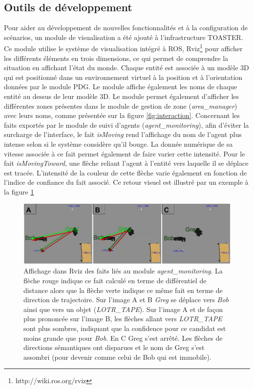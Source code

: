 \documentclass[a4paper,11pt,twoside]{StyleThese}
\begin{document}
\subsection{Outils de développement}
Pour aider au développement de nouvelles fonctionnalités et à la configuration de scénarios, un module de visualisation a été ajouté à l'infrastructure TOASTER. Ce module utilise le système de visualisation intégré à ROS, Rviz\footnote{http://wiki.ros.org/rviz} pour afficher les différents éléments en trois dimensions, ce qui permet de comprendre la situation en affichant l'état du monde. Chaque entité est associée à un modèle 3D qui est positionné dans un environnement virtuel à la position et à l'orientation données par le module PDG. Le module affiche également les noms de chaque entité au dessus de leur modèle 3D. 
Le module permet également d'afficher les différentes zones présentes dans le module de gestion de zone (\textit{area\_manager}) avec leurs noms, comme présentée sur la figure \ref{fig:interaction}.
Concernant les faits exportés par le module de suivi d'agents (\textit{agent\_monitoring}), afin d'éviter la surcharge de l'interface, le fait \textit{isMoving} rend l'affichage du nom de l'agent plus intense selon si le système considère qu'il bouge. La donnée numérique de sa vitesse associée à ce fait permet également de faire varier cette intensité. Pour le fait \textit{isMovingToward}, une flèche reliant l'agent à l'entité vers laquelle il se déplace est tracée. L'intensité de la couleur de cette flèche varie également en fonction de l'indice de confiance du fait associé. Ce retour visuel est illustré par un exemple à la figure \ref{fig:moving}

\begin{figure}[ht!]
 \centering
  \includegraphics[width=1.0\linewidth]{./img/movingToward.jpg} 
  \caption {Affichage dans Rviz des faits liés au module \textit{agent\_monitoring}. La flèche rouge indique ce fait calculé en terme de différentiel de distance alors que la flèche verte indique ce même fait en terme de direction de trajectoire. Sur l'image A et B \textit{Greg} se déplace vers \textit{Bob} ainsi que vers un objet (\textit{LOTR\_TAPE}). Sur l'image A et de façon plus prononcée sur l'image B, les flèches allant vers \textit{LOTR\_TAPE} sont plus sombres, indiquant que la confidence pour ce candidat est moins grande que pour \textit{Bob}. En C Greg s'est arrêté. Les flèches de directions sémantiques ont disparues et le nom de Greg s'est assombri (pour devenir comme celui de Bob qui est immobile).}
  \label{fig:moving}
\end{figure}
\end{document}
